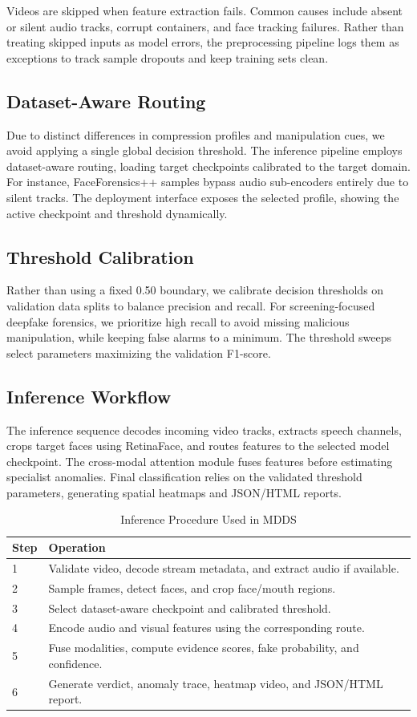 \documentclass[conference]{IEEEtran}
\begin{document}
Videos are skipped when feature extraction fails. Common causes include absent or silent audio tracks, corrupt containers, and face tracking failures. Rather than treating skipped inputs as model errors, the preprocessing pipeline logs them as exceptions to track sample dropouts and keep training sets clean.

\subsection{Dataset-Aware Routing}
Due to distinct differences in compression profiles and manipulation cues, we avoid applying a single global decision threshold. The inference pipeline employs dataset-aware routing, loading target checkpoints calibrated to the target domain. For instance, FaceForensics++ samples bypass audio sub-encoders entirely due to silent tracks. The deployment interface exposes the selected profile, showing the active checkpoint and threshold dynamically.

\subsection{Threshold Calibration}
Rather than using a fixed 0.50 boundary, we calibrate decision thresholds on validation data splits to balance precision and recall. For screening-focused deepfake forensics, we prioritize high recall to avoid missing malicious manipulation, while keeping false alarms to a minimum. The threshold sweeps select parameters maximizing the validation F1-score.

\subsection{Inference Workflow}
The inference sequence decodes incoming video tracks, extracts speech channels, crops target faces using RetinaFace, and routes features to the selected model checkpoint. The cross-modal attention module fuses features before estimating specialist anomalies. Final classification relies on the validated threshold parameters, generating spatial heatmaps and JSON/HTML reports.

\begin{table}[htbp]
\caption{Inference Procedure Used in MDDS}
\centering
\begin{tabular}{p{0.75cm}p{6.45cm}}
\toprule
Step & Operation \\
\midrule
1 & Validate video, decode stream metadata, and extract audio if available. \\
2 & Sample frames, detect faces, and crop face/mouth regions. \\
3 & Select dataset-aware checkpoint and calibrated threshold. \\
4 & Encode audio and visual features using the corresponding route. \\
5 & Fuse modalities, compute evidence scores, fake probability, and confidence. \\
6 & Generate verdict, anomaly trace, heatmap video, and JSON/HTML report. \\
\bottomrule
\end{tabular}
\end{table}
\end{document}
